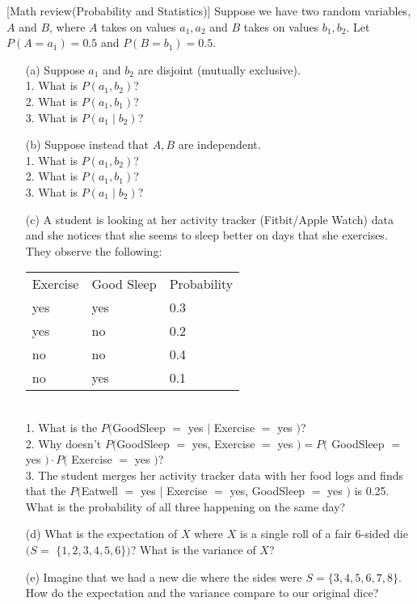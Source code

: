 \item {} [Math review(Probability and Statistics)]
Suppose we have two random variables, $A$ and $B$, where $A$ takes on values $a_1, a_2$ and $B$ takes on values $b_1, b_2$. Let $P\left(A=a_1\right)=0.5$ and $P\left(B=b_1\right)=0.5$.
\begin{itemize}
    \item[(a)] Suppose $a_1$ and $b_2$ are disjoint (mutually exclusive). ~ \\
    1. What is $P\left(a_1, b_2\right)$? \\
    2. What is $P\left(a_1, b_1\right)$? \\
    3. What is $P\left(a_1 \mid b_2\right)$?

    \item[(b)] Suppose instead that $A, B$ are independent. ~ \\
    1. What is $P\left(a_1, b_2\right)$? \\
    2. What is $P\left(a_1, b_1\right)$? \\
    3. What is $P\left(a_1 \mid b_2\right)$?
    \item[(c)] A student is looking at her activity tracker (Fitbit/Apple Watch) data and she notices that she seems to sleep better on days that she exercises. They observe the following: \\
    \begin{tabular}{lll}
    Exercise & Good Sleep & Probability \\
    yes & yes & 0.3 \\
    yes & no & 0.2 \\
    no & no & 0.4 \\
    no & yes & 0.1
    \end{tabular} \\
    1. What is the $P($GoodSleep $=$ yes $|$ Exercise $=$ yes $)$? \\
    2. Why doesn't $P($GoodSleep $=$ yes, Exercise $=$ yes $)=P($ GoodSleep $=$ yes $)\cdot P($ Exercise $=$ yes $)$? \\
    3. The student merges her activity tracker data with her food logs and finds that the $P($Eatwell $=$ yes | Exercise $=$ yes, GoodSleep $=$ yes $)$ is 0.25. What is the probability of all three happening on the same day? ~

    \item[(d)] What is the expectation of $X$ where $X$ is a single roll of a fair 6-sided die $(S=$ $\{1,2,3,4,5,6\})$? What is the variance of $X$? ~

    \item[(e)] Imagine that we had a new die where the sides were $S=\{3,4,5,6,7,8\}$. How do the expectation and the variance compare to our original dice? ~
\end{itemize}

